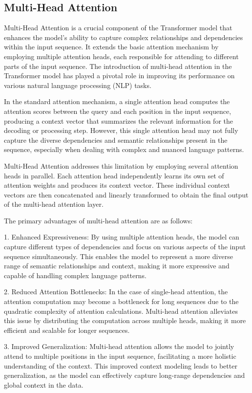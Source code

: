 \documentclass{article}
\begin{document}
\subsection{Multi-Head Attention}

Multi-Head Attention is a crucial component of the Transformer model that enhances the model's ability to capture complex relationships and dependencies within the input sequence. It extends the basic attention mechanism by employing multiple attention heads, each responsible for attending to different parts of the input sequence. The introduction of multi-head attention in the Transformer model has played a pivotal role in improving its performance on various natural language processing (NLP) tasks.

In the standard attention mechanism, a single attention head computes the attention scores between the query and each position in the input sequence, producing a context vector that summarizes the relevant information for the decoding or processing step. However, this single attention head may not fully capture the diverse dependencies and semantic relationships present in the sequence, especially when dealing with complex and nuanced language patterns.

Multi-Head Attention addresses this limitation by employing several attention heads in parallel. Each attention head independently learns its own set of attention weights and produces its context vector. These individual context vectors are then concatenated and linearly transformed to obtain the final output of the multi-head attention layer.

The primary advantages of multi-head attention are as follows:

1. Enhanced Expressiveness: By using multiple attention heads, the model can capture different types of dependencies and focus on various aspects of the input sequence simultaneously. This enables the model to represent a more diverse range of semantic relationships and context, making it more expressive and capable of handling complex language patterns.

2. Reduced Attention Bottlenecks: In the case of single-head attention, the attention computation may become a bottleneck for long sequences due to the quadratic complexity of attention calculations. Multi-head attention alleviates this issue by distributing the computation across multiple heads, making it more efficient and scalable for longer sequences.

3. Improved Generalization: Multi-head attention allows the model to jointly attend to multiple positions in the input sequence, facilitating a more holistic understanding of the context. This improved context modeling leads to better generalization, as the model can effectively capture long-range dependencies and global context in the data.
\end{document}
